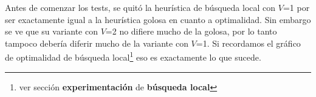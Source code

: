 \par{Antes de comenzar los tests, se quitó la heurística de búsqueda local con
$V$=1 por ser exactamente igual a la heurística golosa en cuanto a optimalidad.
Sin embargo se ve que su variante con $V$=2 no difiere mucho de la golosa, por
lo tanto tampoco debería diferir mucho de la variante con $V$=1. Si recordamos
el gráfico de optimalidad de búsqueda local\footnote{ver sección
\textbf{experimentación} de \textbf{búsqueda local}} eso es exactamente lo que
sucede.}
